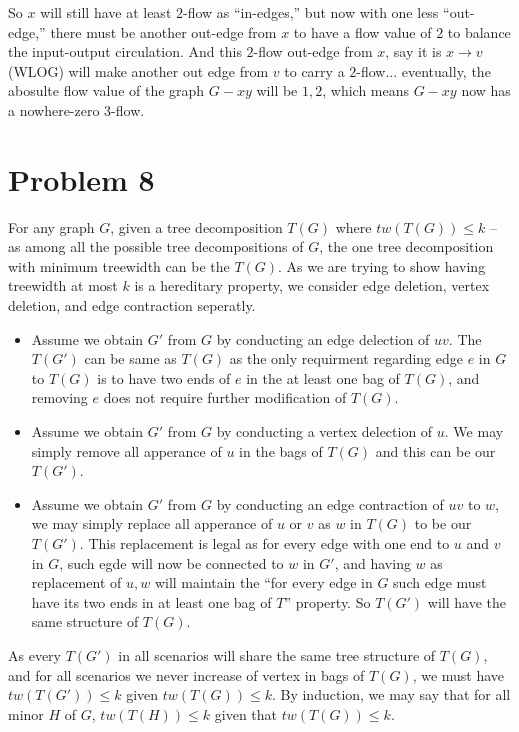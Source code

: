 \documentclass[11pt]{article}
\begin{document}
So $x$ will still have at least $2$-flow as ``in-edges,'' but now with one less ``out-edge,'' there must be another out-edge from $x$ to have a flow value of $2$ to balance the input-output circulation. And this $2$-flow out-edge from $x$, say it is $x \to v$ (WLOG) will make another out edge from $v$ to carry a $2$-flow... eventually, the abosulte flow value of the graph $G-xy$ will be $1, 2$, which means $G-xy$ now has a nowhere-zero 3-flow.

\section*{Problem 8}

For any graph $G$, given a tree decomposition $T(G)$ where $tw(T(G)) \leq k$ -- as among all the possible tree decompositions of $G$, the one tree decomposition with minimum treewidth can be the $T(G)$. As we are trying to show having treewidth at most $k$ is a hereditary property, we consider edge deletion, vertex deletion, and edge contraction seperatly.

\begin{itemize}
    \item Assume we obtain $G'$ from $G$ by conducting an edge delection of $uv$. The $T(G')$ can be same as $T(G)$ as the only requirment regarding edge $e$ in $G$ to $T(G)$ is to have two ends of $e$ in the at least one bag of $T(G)$, and removing $e$ does not require further modification of $T(G)$.
    \item Assume we obtain $G'$ from $G$ by conducting a vertex delection of $u$. We may simply remove all apperance of $u$ in the bags of $T(G)$ and this can be our $T(G')$.
    \item Assume we obtain $G'$ from $G$ by conducting an edge contraction of $uv$ to $w$, we may simply replace all apperance of $u$ or $v$ as $w$ in $T(G)$ to be our $T(G')$. This replacement is legal as for every edge with one end to $u$ and $v$ in $G$, such egde will now be connected to $w$ in $G'$, and having $w$ as replacement of $u, w$ will maintain the ``for every edge in $G$ such edge must have its two ends in at least one bag of $T$'' property. So $T(G')$ will have the same structure of $T(G)$.
\end{itemize}

As every $T(G')$ in all scenarios will share the same tree structure of $T(G)$, and for all scenarios we never increase of vertex in bags of $T(G)$, we must have $tw(T(G')) \leq k$ given $tw(T(G)) \leq k$. By induction, we may say that for all minor $H$ of $G$,  $tw(T(H)) \leq k$ given that $tw(T(G)) \leq k$.
\end{document}
